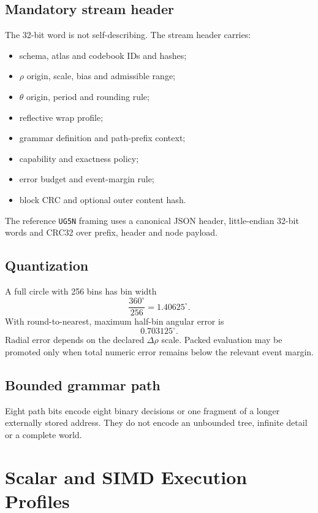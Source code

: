 \documentclass[11pt,a4paper]{article}
\begin{document}
\subsection{Mandatory stream header}
The 32-bit word is not self-describing. The stream header carries:
\begin{itemize}
\item schema, atlas and codebook IDs and hashes;
\item \(\rho\) origin, scale, bias and admissible range;
\item \(\theta\) origin, period and rounding rule;
\item reflective wrap profile;
\item grammar definition and path-prefix context;
\item capability and exactness policy;
\item error budget and event-margin rule;
\item block CRC and optional outer content hash.
\end{itemize}

The reference \texttt{UG5N} framing uses a canonical JSON header, little-endian 32-bit words and CRC32 over prefix, header and node payload.

\subsection{Quantization}
A full circle with 256 bins has bin width
\[
\frac{360^{\circ}}{256}=1.40625^{\circ}.
\]
With round-to-nearest, maximum half-bin angular error is
\[
0.703125^{\circ}.
\]
Radial error depends on the declared \(\Delta\rho\) scale. Packed evaluation may be promoted only when total numeric error remains below the relevant event margin.

\subsection{Bounded grammar path}
Eight path bits encode eight binary decisions or one fragment of a longer externally stored address. They do not encode an unbounded tree, infinite detail or a complete world.

\section{Scalar and SIMD Execution Profiles}
\end{document}
